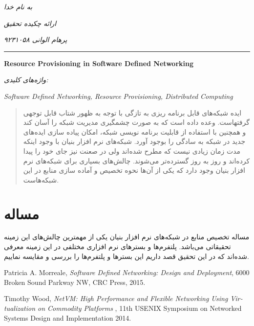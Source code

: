 ﻿\documentclass[11pt]{article}
\begin{document}
\begin{titlepage}
	\centering
	\emph{به نام خدا}\par
	\vspace{.5cm}
	\emph{ارائه چکیده تحقیق}\par
	\vspace{.5cm}
	\emph{پرهام الوانی ۹۲۳۱۰۵۸}\par
	\vspace{.25cm}
	\rule{\textwidth}{1pt}
	\vspace{.25cm}
	\begin{latin}
		{\huge\bfseries Resource Provisioning in Software Defined Networking}\par
	\end{latin}
	\vspace{.5cm}
	\emph{واژه‌های کلیدی:}
	\vspace{.1cm}
	\begin{latin}
		\emph{Software Defined Networking, Resource Provisioning, Distributed Computing}
	\end{latin}
\end{titlepage}
\begin{abstract}
	ایده شبکه‌های قابل برنامه ریزی به تازگی با توجه به ظهور  شتاب قابل توجهی گرفتهاست.
	 وعده داده است که به صورت چشمگیری مدیریت شبکه را آسان کند و همچنین با استفاده از قابلیت برنامه نویسی شبکه، امکان پیاده سازی ایده‌های جدید در شبکه به سادگی را بوجود آورد.
شبکه‌های نرم افزار بنیان با وجود اینکه مدت زمان زیادی نیست که مطرح شده‌اند ولی در صعنت نیز جای خود را پیدا کرده‌اند و روز به روز گسترده‌تر می‌شوند. چالش‌های بسیاری برای شبکه‌های نرم افزار بنیان وجود دارد که یکی از آن‌ها نحوه تخصیص و آماده سازی منابع در این شبکه‌هاست.
\end{abstract}
\section*{مساله}
	مساله تخصیص منابع در شبکه‌های نرم افزار بنیان یکی از مهمترین چالش‌های این زمینه تحقیقاتی می‌باشد. پلتفرم‌ها و بستر‌های نرم افزاری مختلفی در این زمینه معرفی شده‌اند که در این تحقیق قصد داریم این بستر‌ها و پلتفرم‌ها را بررسی و مقایسه نماییم.

\begin{thebibliography}{9}
	\begin{latin}
		Patricia A. Morreale,
		\emph{Software Defined Networking: Design and Deployment},
		6000 Broken Sound Parkway NW,
		CRC Press,
		2015.
	\end{latin}

	\begin{latin}
		Timothy Wood,
		\emph{NetVM: High Performance and Flexible Networking
Using Virtualization on Commodity Platforms },
		11th USENIX Symposium on Networked Systems Design and Implementation
  		2014.
	\end{latin}

\end{thebibliography}
\end{document}
